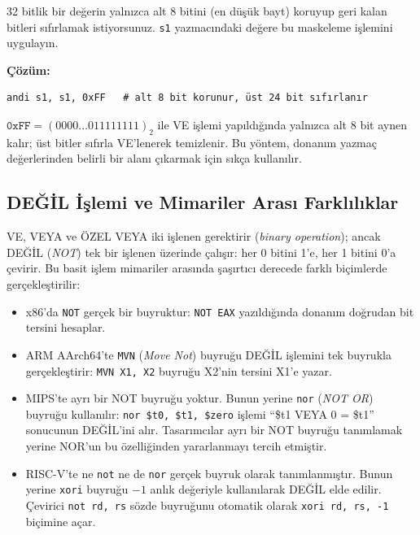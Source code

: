 \begin{ornek}[3.12]
32 bitlik bir değerin yalnızca alt 8 bitini (en düşük bayt) koruyup geri kalan bitleri sıfırlamak istiyorsunuz. \texttt{s1} yazmacındaki değere bu maskeleme işlemini uygulayın.

\textbf{Çözüm:}
\begin{lstlisting}[style=riscv]
andi s1, s1, 0xFF   # alt 8 bit korunur, üst 24 bit sıfırlanır
\end{lstlisting}

$\texttt{0xFF} = (0000\ldots011111111)_2$ ile VE işlemi yapıldığında yalnızca alt 8 bit aynen kalır; üst bitler sıfırla VE'lenerek temizlenir. Bu yöntem, donanım yazmaç değerlerinden belirli bir alanı çıkarmak için sıkça kullanılır.
\end{ornek}

\subsection{DEĞİL İşlemi ve Mimariler Arası Farklılıklar}
\label{sec:degil-islemi}

VE, VEYA ve ÖZEL VEYA iki işlenen gerektirir (\emph{binary operation}); ancak DEĞİL (\textit{NOT}) tek bir işlenen üzerinde çalışır: her 0 bitini 1'e, her 1 bitini 0'a çevirir. Bu basit işlem mimariler arasında şaşırtıcı derecede farklı biçimlerde gerçekleştirilir:

\begin{itemize}[nosep]
\item x86'da \texttt{NOT} gerçek bir buyruktur: \texttt{NOT EAX} yazıldığında donanım doğrudan bit tersini hesaplar.
\item ARM AArch64'te \texttt{MVN} (\emph{Move Not}) buyruğu DEĞİL işlemini tek buyrukla gerçekleştirir: \texttt{MVN X1, X2} buyruğu X2'nin tersini X1'e yazar.
\item MIPS'te ayrı bir NOT buyruğu yoktur. Bunun yerine \texttt{nor} (\emph{NOT OR}) buyruğu kullanılır: \texttt{nor \$t0, \$t1, \$zero} işlemi ``\$t1 VEYA 0 = \$t1'' sonucunun DEĞİL'ini alır. Tasarımcılar ayrı bir NOT buyruğu tanımlamak yerine NOR'un bu özelliğinden yararlanmayı tercih etmiştir.
\item RISC-V'te ne \texttt{not} ne de \texttt{nor} gerçek buyruk olarak tanımlanmıştır. Bunun yerine \texttt{xori} buyruğu $-1$ anlık değeriyle kullanılarak DEĞİL elde edilir. Çevirici \texttt{not rd, rs} sözde buyruğunu otomatik olarak \texttt{xori rd, rs, -1} biçimine açar.
\end{itemize}

